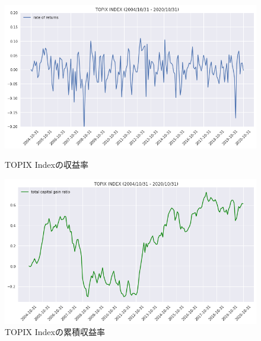 \documentclass[dvipdfmx,autodetect-engine]{jsarticle}
\begin{document}
\begin{figure}[htbp]
    \begin{minipage}{0.5\hsize}
        \begin{center}
            \includegraphics[width=1.0\hsize]{./figures/topixindex_chg_20041031-20201031.png}
            \caption{TOPIX Indexの収益率}
            \label{fig:one}
        \end{center}
    \end{minipage}
    \begin{minipage}{0.5\hsize}
        \begin{center}
            \includegraphics[width=1.0\hsize]{./figures/topixindex_cum_20041031-20201031.png}
            \caption{TOPIX Indexの累積収益率}
            \label{fig:two}
        \end{center}
    \end{minipage}
\end{figure}
\end{document}
